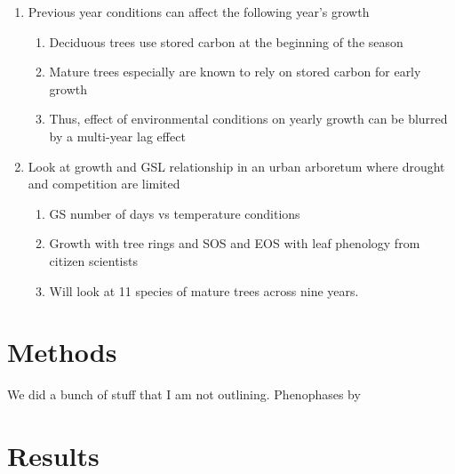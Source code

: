 \begin{enumerate}
\begin{enumerate}
  \end{enumerate}
  
\item Previous year conditions can affect the following year's growth
  \begin{enumerate}
  \item Deciduous trees use stored carbon at the beginning of the season
  
  \item Mature trees especially are known to rely on stored carbon for early growth 
  
  \item Thus, effect of environmental conditions on yearly growth can be blurred by a multi-year lag effect %
  
  \end{enumerate}
  
\item Look at growth and GSL relationship in an urban arboretum where drought and competition are limited
  \begin{enumerate}
  \item GS number of days vs temperature conditions
  
  \item Growth with tree rings and SOS and EOS with leaf phenology from citizen scientists 
  
  \item Will look at 11 species of mature trees across nine years. %
  \end{enumerate}
\end{enumerate}

\section*{Methods}
We did a bunch of stuff that I am not outlining. Phenophases by \citep{denny_standardized_2014}

\clearpage
\section*{Results}

